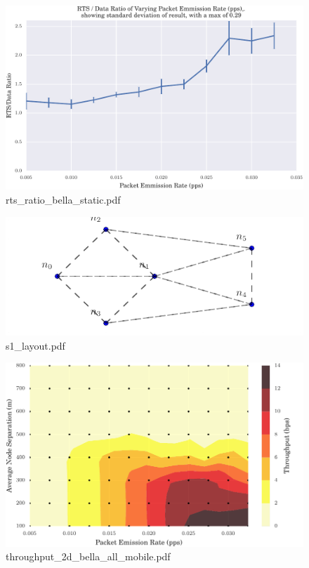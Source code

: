 \documentclass{article}
\begin{document}
\begin{figure}[h!]
\centering
\includegraphics[width=\linewidth]{rts_ratio_bella_static.pdf}
\caption{rts\_ratio\_bella\_static.pdf}
\end{figure}




\begin{figure}[h!]
\centering
\includegraphics[width=\linewidth]{s1_layout.pdf}
\caption{s1\_layout.pdf}
\end{figure}




\begin{figure}[h!]
\centering
\includegraphics[width=\linewidth]{throughput_2d_bella_all_mobile.pdf}
\caption{throughput\_2d\_bella\_all\_mobile.pdf}
\end{figure}
\end{document}
